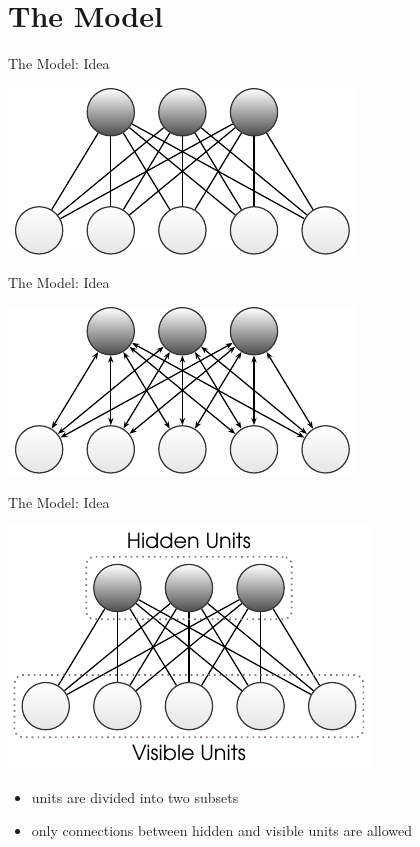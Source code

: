\documentclass[aspectratio=169]{beamer}
\begin{document}
  \section{The Model} %
  \label{sec:The Model}
    \begin{frame}{The Model: Idea}
      \vfill
      \begin{center}
        \includegraphics[scale=1.6]{figures/rbm-scheme-empty.pdf}
      \end{center}
      \vfill
    \end{frame}

    \begin{frame}{The Model: Idea}
      \vfill
      \begin{center}
        \includegraphics[scale=1.6]{figures/rbm-scheme-arrows.pdf}
      \end{center}
      \vfill
    \end{frame}

    \begin{frame}{The Model: Idea}
      \begin{center}
        \includegraphics[scale=1.2]{figures/rbm-scheme-layers.pdf}
      \end{center}
      \begin{itemize}
        \pause
        \item units are divided into two subsets
        \pause
        \item only connections between hidden and visible units are allowed
      \end{itemize}
    \end{frame}
\end{document}
